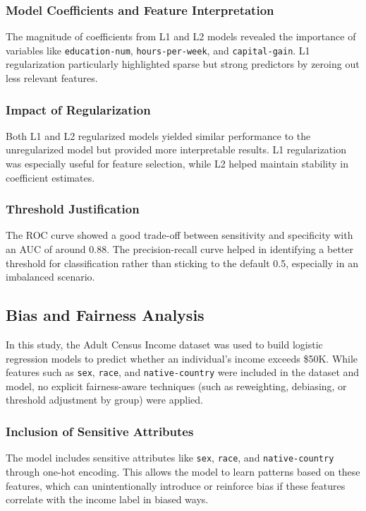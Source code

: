 \documentclass[a4paper,12pt]{article}
\begin{document}
\subsubsection*{Model Coefficients and Feature Interpretation}
The magnitude of coefficients from L1 and L2 models revealed the importance of variables like \texttt{education-num}, \texttt{hours-per-week}, and \texttt{capital-gain}. L1 regularization particularly highlighted sparse but strong predictors by zeroing out less relevant features.

\subsubsection*{Impact of Regularization}
Both L1 and L2 regularized models yielded similar performance to the unregularized model but provided more interpretable results. L1 regularization was especially useful for feature selection, while L2 helped maintain stability in coefficient estimates.

\subsubsection*{Threshold Justification}
The ROC curve showed a good trade-off between sensitivity and specificity with an AUC of around 0.88. The precision-recall curve helped in identifying a better threshold for classification rather than sticking to the default 0.5, especially in an imbalanced scenario.

\subsection{Bias and Fairness Analysis}

In this study, the Adult Census Income dataset was used to build logistic regression models to predict whether an individual's income exceeds \$50K. While features such as \texttt{sex}, \texttt{race}, and \texttt{native-country} were included in the dataset and model, no explicit fairness-aware techniques (such as reweighting, debiasing, or threshold adjustment by group) were applied.

\subsubsection*{Inclusion of Sensitive Attributes}

The model includes sensitive attributes like \texttt{sex}, \texttt{race}, and \texttt{native-country} through one-hot encoding. This allows the model to learn patterns based on these features, which can unintentionally introduce or reinforce bias if these features correlate with the income label in biased ways.
\end{document}
